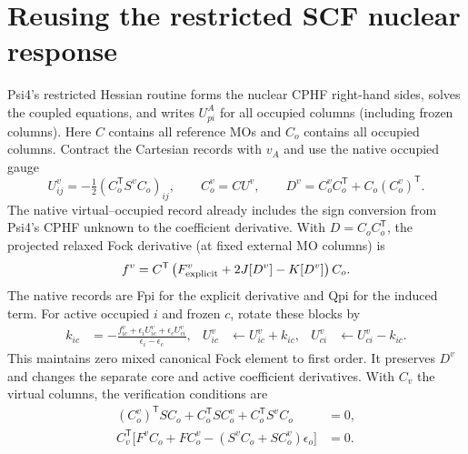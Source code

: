 \documentclass[11pt]{article}
\begin{document}
\section{Reusing the restricted SCF nuclear response}
Psi4's restricted Hessian routine forms the nuclear CPHF right-hand sides,
solves the coupled equations, and writes $U_{pi}^{A}$ for all occupied
columns (including frozen columns). Here $C$ contains all reference MOs and
$C_o$ contains all occupied columns. Contract the Cartesian records with
$v_A$ and use the native occupied gauge
\begin{equation}
 U_{ij}^{v}=-\tfrac12(C_o^{\mathsf T}S^v C_o)_{ij},\qquad
 C_o^v=CU^v,\qquad D^v=C_o^v C_o^{\mathsf T}+C_o(C_o^v)^{\mathsf T}.
\end{equation}
The native virtual--occupied record already includes the sign conversion
from Psi4's CPHF unknown to the coefficient derivative. With $D=C_o C_o^{\mathsf T}$,
the projected relaxed Fock derivative (at fixed external MO columns) is
\begin{equation}
 f^v=C^{\mathsf T}\left(F_{\rm explicit}^{v}+2J[D^v]-K[D^v]\right)C_o.
\end{equation}
The native records are Fpi for the explicit derivative and Qpi for the
induced term. For active occupied $i$ and frozen $c$, rotate these blocks by
\begin{align}
 k_{ic}&=-\frac{f^v_{ic}+\epsilon_i U^v_{ic}+\epsilon_c U^v_{ci}}
                   {\epsilon_i-\epsilon_c},&
 U^v_{ic}&\gets U^v_{ic}+k_{ic},&
 U^v_{ci}&\gets U^v_{ci}-k_{ic}.
\end{align}
This maintains zero mixed canonical Fock element to first order. It preserves
$D^v$ and changes the separate core and active coefficient derivatives.
With $C_v$ the virtual columns, the verification conditions are
\begin{align}
 (C_o^v)^{\mathsf T}SC_o+C_o^{\mathsf T}SC_o^v+C_o^{\mathsf T}S^v C_o&=0,\\
 C_v^{\mathsf T}\big[F^v C_o+FC_o^v-(S^v C_o+SC_o^v)\epsilon_o\big]&=0 .
\end{align}
\end{document}
